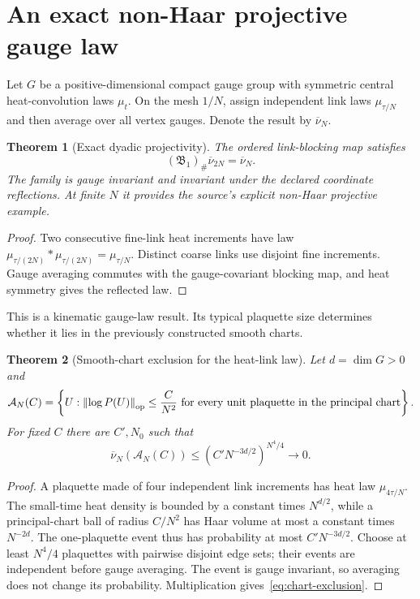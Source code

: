 \documentclass[11pt,a4paper,oneside]{book}
\theoremstyle{plain}
\newtheorem{theorem}{Theorem}[chapter]
\theoremstyle{definition}
\theoremstyle{remark}
\newcommand{\norm}[1]{\left\lVert#1\right\rVert}
\newcommand{\src}[2]{\cite{#1}}
\begin{document}
\section{An exact non-Haar projective gauge law}
Let $G$ be a positive-dimensional compact gauge group with symmetric central heat-convolution laws $\mu_t$. On the mesh $1/N$, assign independent link laws $\mu_{\tau/N}$ and then average over all vertex gauges. Denote the result by $\overline\nu_N$.

\begin{theorem}[Exact dyadic projectivity]
\label{thm:heat-projective}
The ordered link-blocking map satisfies
\begin{equation}
 (\mathfrak B_1)_\#\overline\nu_{2N}=\overline\nu_N.
 \label{eq:heat-projective}
\end{equation}
The family is gauge invariant and invariant under the declared coordinate reflections. At finite $N$ it provides the source's explicit non-Haar projective example.
\end{theorem}
\begin{proof}
Two consecutive fine-link heat increments have law $\mu_{\tau/(2N)}*\mu_{\tau/(2N)}=\mu_{\tau/N}$. Distinct coarse links use disjoint fine increments. Gauge averaging commutes with the gauge-covariant blocking map, and heat symmetry gives the reflected law.
\end{proof}
\src{R18}{thm:v18v99-product-projective,thm:v18v99-gauge-projective}
This is a kinematic gauge-law result. Its typical plaquette size determines whether it lies in the previously constructed smooth charts.

\begin{theorem}[Smooth-chart exclusion for the heat-link law]
\label{thm:heat-chart-exclusion}
Let $d=\dim G>0$ and
\begin{equation}
 \mathcal A_N(C)=\left\{U:\norm{\log P(U)}_{\rm op}\le\frac C{N^2}
 \ \text{for every unit plaquette in the principal chart}\right\}.
\end{equation}
For fixed $C$ there are $C',N_0$ such that
\begin{equation}
 \overline\nu_N(\mathcal A_N(C))
 \le\left(C'N^{-3d/2}\right)^{N^4/4}\longrightarrow0.
 \label{eq:chart-exclusion}
\end{equation}
\end{theorem}
\begin{proof}
A plaquette made of four independent link increments has heat law $\mu_{4\tau/N}$. The small-time heat density is bounded by a constant times $N^{d/2}$, while a principal-chart ball of radius $C/N^2$ has Haar volume at most a constant times $N^{-2d}$. The one-plaquette event thus has probability at most $C'N^{-3d/2}$. Choose at least $N^4/4$ plaquettes with pairwise disjoint edge sets; their events are independent before gauge averaging. The event is gauge invariant, so averaging does not change its probability. Multiplication gives~\eqref{eq:chart-exclusion}.
\end{proof}
\src{R19}{thm:v19v1-chart-exclusion}
\end{document}
